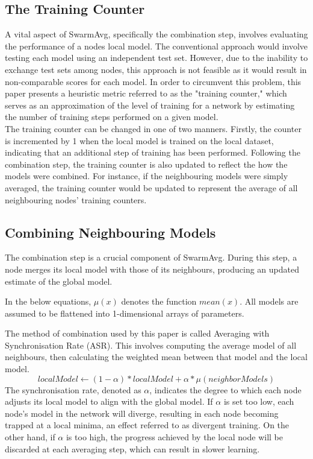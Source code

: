\documentclass[letterpaper, 10 pt, conference]{ieeeconf}  %
\begin{document}
\subsection{The Training Counter}
A vital aspect of SwarmAvg, specifically the combination step, involves evaluating the performance of a nodes local model. The conventional approach would involve testing each model using an independent test set. However, due to the inability to exchange test sets among nodes, this approach is not feasible as it would result in non-comparable scores for each model. In order to circumvent this problem, this paper presents a heuristic metric referred to as the "training counter," which serves as an approximation of the level of training for a network by estimating the number of training steps performed on a given model. \\

The training counter can be changed in one of two manners. Firstly, the counter is incremented by 1 when the local model is trained on the local dataset, indicating that an additional step of training has been performed. Following the combination step, the training counter is also updated to reflect the how the models were combined. For instance, if the neighbouring models were simply averaged, the training counter would be updated to represent the average of all neighbouring nodes' training counters.

\subsection{Combining Neighbouring Models} \label{mcm}
The combination step is a crucial component of SwarmAvg. During this step, a node merges its local model with those of its neighbours, producing an updated estimate of the global model.

In the below equations, $\mu(x)$ denotes the function $mean(x)$. All models are assumed to be flattened into 1-dimensional arrays of parameters.

The method of combination used by this paper is called Averaging with Synchronisation Rate (ASR). This involves computing the average model of all neighbours, then calculating the weighted mean between that model and the local model.
\[ localModel \gets (1 - \alpha) * localModel + \alpha * \mu(neighborModels) \]
The synchronisation rate, denoted as $\alpha$, indicates the degree to which each node adjusts its local model to align with the global model. If $\alpha$ is set too low, each node's model in the network will diverge, resulting in each node becoming trapped at a local minima, an effect referred to as divergent training. On the other hand, if $\alpha$ is too high, the progress achieved by the local node will be discarded at each averaging step, which can result in slower learning. \\
\end{document}
